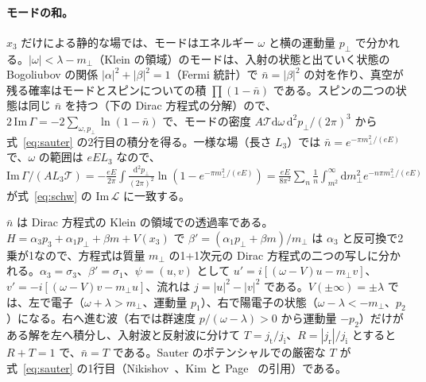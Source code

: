 \documentclass[a4paper,10pt]{ltjsarticle}
\newcommand{\dd}{\mathrm{d}}
\begin{document}
\paragraph{モードの和。}$x_3$ だけによる静的な場では、モードはエネルギー $\omega$ と横の運動量 $p_\perp$ で分かれる。$|\omega|<\lambda-m_\perp$（Klein の領域）のモードは、入射の状態と出ていく状態の Bogoliubov の関係 $|\alpha|^2+|\beta|^2=1$（Fermi 統計）で $\bar n=|\beta|^2$ の対を作り、真空が残る確率はモードとスピンについての積 $\prod(1-\bar n)$ である。スピンの二つの状態は同じ $\bar n$ を持つ（下の Dirac 方程式の分解）ので、$2\,\mathrm{Im}\,\Gamma=-2\sum_{\omega,p_\perp}\ln(1-\bar n)$ で、モードの密度 $A\mathcal T\dd\omega\,\dd^2p_\perp/(2\pi)^3$ から式~\eqref{eq:sauter} の2行目の積分を得る。一様な場（長さ $L_3$）では $\bar n=e^{-\pi m_\perp^2/(eE)}$ で、$\omega$ の範囲は $eEL_3$ なので、$\mathrm{Im}\,\Gamma/(AL_3\mathcal T)=-\frac{eE}{2\pi}\int\frac{\dd^2p_\perp}{(2\pi)^2}\ln(1-e^{-\pi m_\perp^2/(eE)})=\frac{eE}{8\pi^2}\sum_n\frac1n\int_{m^2}^\infty\dd m_\perp^2e^{-n\pi m_\perp^2/(eE)}$ が式~\eqref{eq:schw} の $\mathrm{Im}\,\mathcal L$ に一致する。

$\bar n$ は Dirac 方程式の Klein の領域での透過率である。$H=\alpha_3p_3+\alpha_1p_\perp+\beta m+V(x_3)$ で $\beta'=(\alpha_1p_\perp+\beta m)/m_\perp$ は $\alpha_3$ と反可換で2乗が1なので、方程式は質量 $m_\perp$ の1+1次元の Dirac 方程式の二つの写しに分かれる。$\alpha_3=\sigma_3$、$\beta'=\sigma_1$、$\psi=(u,v)$ として $u'=i[(\omega-V)u-m_\perp v]$、$v'=-i[(\omega-V)v-m_\perp u]$、流れは $j=|u|^2-|v|^2$ である。$V(\pm\infty)=\pm\lambda$ では、左で電子（$\omega+\lambda>m_\perp$、運動量 $p_1$）、右で陽電子の状態（$\omega-\lambda<-m_\perp$、$p_2$）になる。右へ進む波（右では群速度 $p/(\omega-\lambda)>0$ から運動量 $-p_2$）だけがある解を左へ積分し、入射波と反射波に分けて $T=j_{\mathrm t}/j_{\mathrm i}$、$R=|j_{\mathrm r}|/j_{\mathrm i}$ とすると $R+T=1$ で、$\bar n=T$ である。Sauter のポテンシャルでの厳密な $T$ が式~\eqref{eq:sauter} の1行目（Nikishov~\cite{nikishov70}、Kim と Page~\cite{kp06} の引用）である。
\end{document}
